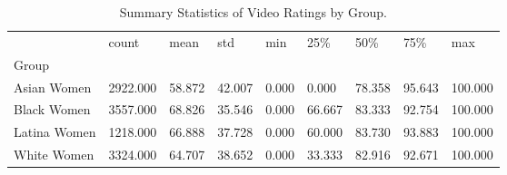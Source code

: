\begin{table}[htbp]
\centering
\caption{Summary Statistics of Video Ratings by Group.}
\label{tab:eda_rating_stats}
\begin{tabular}{lllllllll}
\toprule
 & count & mean & std & min & 25\% & 50\% & 75\% & max \\
Group &  &  &  &  &  &  &  &  \\
\midrule
Asian Women & 2922.000 & 58.872 & 42.007 & 0.000 & 0.000 & 78.358 & 95.643 & 100.000 \\
Black Women & 3557.000 & 68.826 & 35.546 & 0.000 & 66.667 & 83.333 & 92.754 & 100.000 \\
Latina Women & 1218.000 & 66.888 & 37.728 & 0.000 & 60.000 & 83.730 & 93.883 & 100.000 \\
White Women & 3324.000 & 64.707 & 38.652 & 0.000 & 33.333 & 82.916 & 92.671 & 100.000 \\
\bottomrule
\end{tabular}

\end{table}